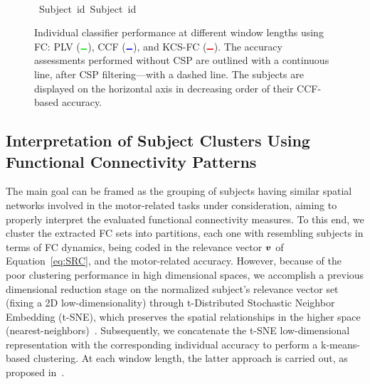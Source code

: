 \begin{figure}[h!]
	{} \\
	\hbox{\hspace{3.3cm} \footnotesize{Subject id}\hspace{5.1cm} \footnotesize{Subject id}}
	\caption{Individual classifier performance at different window lengths using FC: PLV (${\lineplot{color5}}$), CCF (${\lineplot{color1}}$), and KCS-FC (${\lineplot{color3}}$). The accuracy assessments performed without CSP are outlined with a continuous line, after CSP filtering---with a dashed line. The subjects are displayed on the horizontal axis in decreasing order of their CCF-based accuracy.}
	\label{Fig:IndividualAcc}
\end{figure}

\subsection{Interpretation of Subject Clusters Using Functional Connectivity Patterns}

The main goal can be framed as the grouping of subjects having similar spatial networks involved in the motor-related tasks under consideration, aiming to properly interpret the evaluated functional connectivity measures. {To this end, we cluster the extracted FC sets into partitions, each one with resembling subjects in terms of FC dynamics, being coded in the relevance vector $\bm {v}$ of Equation~\eqref{eq:SRC}, and the motor-related accuracy. However, because of the poor clustering performance in high dimensional spaces, we accomplish a previous dimensional reduction stage on the normalized subject's relevance vector set (fixing a 2D low-dimensionality) through t-Distributed Stochastic Neighbor Embedding (t-SNE), which preserves the spatial relationships in the higher space (nearest-neighbors)~\cite{linderman2019clustering}. Subsequently, we concatenate the t-SNE low-dimensional representation with the corresponding individual accuracy to perform a {k}-means-based clustering. At each window length, the latter approach is carried out, as proposed in~\cite{Kim2019}.}

